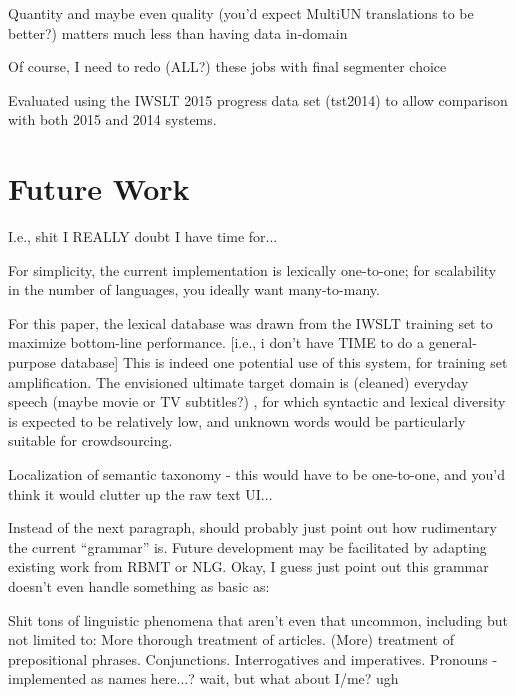 Quantity and maybe even quality (you'd expect MultiUN translations to be better?) matters much less than having data in-domain

Of course, I need to redo (ALL?) these jobs with final segmenter choice

Evaluated using the IWSLT 2015 progress data set (tst2014) to allow comparison with both 2015 and 2014 systems.


\section{Future Work}

I.e., shit I REALLY doubt I have time for...

For simplicity, the current implementation is lexically one-to-one; for scalability in the number of languages, you ideally want many-to-many.

For this paper, the lexical database was drawn from the IWSLT training set to maximize bottom-line performance.
[i.e., i don't have TIME to do a general-purpose database]
This is indeed one potential use of this system, for training set amplification.
The envisioned ultimate target domain is (cleaned) everyday speech (maybe movie or TV subtitles?) , for which syntactic and lexical diversity is expected to be relatively low, and unknown words would be particularly suitable for crowdsourcing.

Localization of semantic taxonomy - this would have to be one-to-one, and you'd think it would clutter up the raw text UI...


Instead of the next paragraph, should probably just point out how rudimentary the current ``grammar'' is. 
Future development may be facilitated by adapting existing work from RBMT or NLG. 
Okay, I guess just point out this grammar doesn't even handle something as basic as:

Shit tons of linguistic phenomena that aren't even that uncommon, including but not limited to:
More thorough treatment of articles.
(More) treatment of prepositional phrases.
Conjunctions.
Interrogatives and imperatives.
Pronouns - implemented as names here...? wait, but what about I/me? ugh






